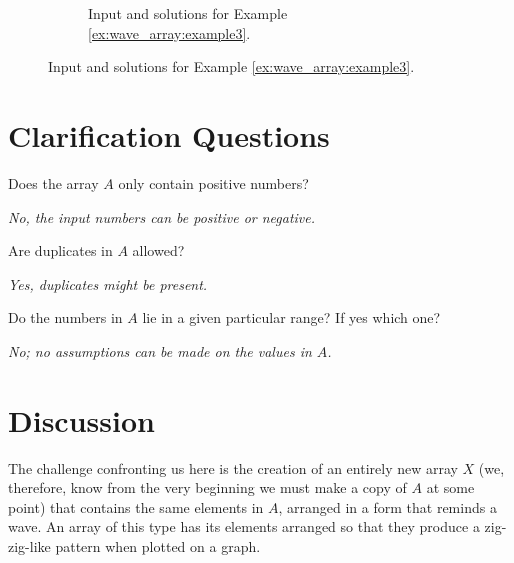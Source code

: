 \begin{figure}
\begin{subfigure}[t]{0.80\textwidth}
		 \caption{Input and solutions for Example \ref{ex:wave_array:example3}.}
		 \label{fig:wave_array:example13}
	  \end{subfigure}
\end{figure}


\section{Clarification Questions}

\begin{QandA}
	\item \begin{questionitem} \begin{question} Does the array $A$ only contain positive numbers?  \end{question} 	 
    \begin{answered}
		\textit{No, the input numbers can be positive or negative.}
	\end{answered} \end{questionitem}
	\item \begin{questionitem} \begin{question} Are duplicates in $A$ allowed?  \end{question} 	 
    \begin{answered}
		\textit{Yes, duplicates might be present.}
	\end{answered} \end{questionitem}
	\item \begin{questionitem} \begin{question} Do the numbers in $A$ lie in a given particular range? If yes which one?  \end{question} 	 
    \begin{answered}
		\textit{No; no assumptions can be made on the values in $A$.}
	\end{answered} \end{questionitem}
\end{QandA}

\section{Discussion}
\label{wave_array:sec:discussion}
The challenge confronting us here is the creation of an entirely new array $X$ (we, therefore, know from the very beginning we must make a copy of $A$ at some point) that contains the same elements in $A$, arranged in a form that reminds a wave. 
An array of this type has its elements arranged so that they produce a zig-zig-like pattern when plotted on a graph. 

